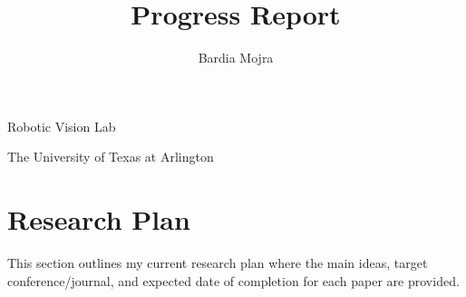 \documentclass[11pt]{article}
\title{Progress Report}
\author{Bardia Mojra}
\begin{document}
\maketitle
\thispagestyle{empty}

\bigskip
\bigskip
\begin{center}
 Robotic Vision Lab
\end{center}

\begin{center}
The University of Texas at Arlington
\end{center}

\newpage

\section{Research Plan}
This section outlines my current research plan where the main ideas, target
conference/journal, and expected date of completion for each paper
are provided.
\end{document}
